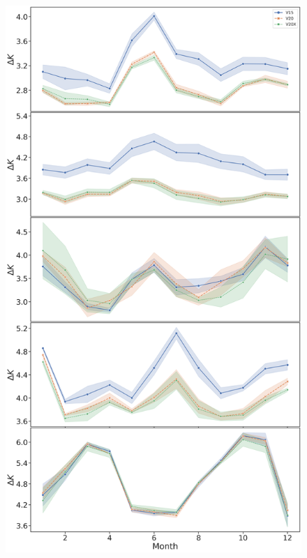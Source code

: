 \documentclass[hess, twostagejnl]{copernicus}
\providecommand{\DIFaddbeginFL}{} %
\providecommand{\DIFdelendFL}{} %
\begin{document}
{\begin{figure}
\DIFdelendFL \DIFaddbeginFL \includegraphics[scale=0.2]{new_timeseries_noise}

\end{figure}}
\end{document}
